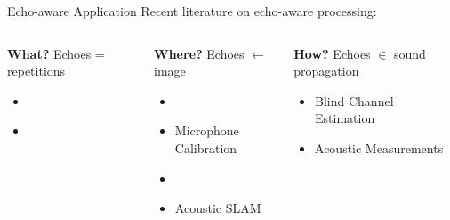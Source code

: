 \begin{frame}[t]{Echo-aware Application \hfill\faBook}
    Recent literature on echo-aware processing:
    \begin{columns}[T,onlytextwidth]
        \begin{block}{\textbf{What?}}
            Echoes = repetitions
            \begin{itemize}
                \item {}
                \\{\footnotesize\cite{leglaive2016multichannel}}
                \item {}
                \\{\footnotesize\cite{flanagan1993spatially,dokmanic2015raking,kowalczyk2020raking}}
            \end{itemize}
        \end{block}
        \begin{block}{\textbf{Where?}}
            \small
            Echoes $\gets$ image
            \begin{itemize}
                \item {}
                \\{\footnotesize\cite{ribeiro2010turning,jensen2019method}}
                \item Microphone Calibration
                \\{\footnotesize\cite{dokmanic2015raking,salvati2016sound}}
                \item {}
                \\{\footnotesize\cite{antonacci2012inferences,crocco2017uncalibrated}}
                \item Acoustic SLAM
                \\{\footnotesize\cite{evers2018acoustic,krekovic2016echoslam}}
            \end{itemize}
        \end{block}
        \begin{block}{\textbf{How?}}
            \small
            Echoes $\in$ sound propagation
            \begin{itemize}
                \item Blind Channel Estimation
                \\{\footnotesize\cite{lin2007blind,crocco2017uncalibrated}}
                \item Acoustic Measurements
                \\{\footnotesize\cite{eaton2015ace,kuttruff2016room}}
            \end{itemize}
        \end{block}
    \end{columns}



\end{frame}
